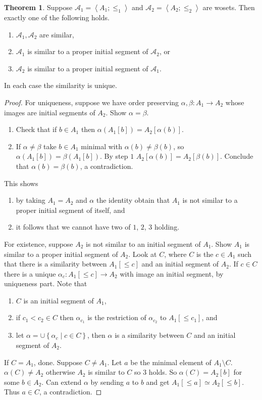 \documentclass{article}
\newcommand{\A}{\mathcal{A}}
\newcommand{\rb}[1]{\left( #1 \right)}
\renewcommand{\sb}[1]{\left[ #1 \right]}
\newcommand{\cb}[1]{\left\{ #1 \right\}}
\newcommand{\ab}[1]{\left\langle #1 \right\rangle}
\theoremstyle{definition}\newtheorem{definition}{Definition}[subsection]
\theoremstyle{definition}\newtheorem{remark}[definition]{Remark}
\theoremstyle{definition}\newtheorem*{example}{Example}
\theoremstyle{definition}\newtheorem*{note}{Note}
\newtheorem{theorem}[definition]{Theorem}
\begin{document}
\begin{theorem}
\label{thm:3.3.7}
Suppose $ \A_1 = \ab{A_1; \le_1} $ and $ \A_2 = \ab{A_2; \le_2} $ are wosets. Then exactly one of the following holds.
\begin{enumerate}
\item $ \A_1, \A_2 $ are similar,
\item $ \A_1 $ is similar to a proper initial segment of $ \A_2 $, or
\item $ \A_2 $ is similar to a proper initial segment of $ \A_1 $.
\end{enumerate}
In each case the similarity is unique.
\end{theorem}

\begin{proof}
For uniqueness, suppose we have order preserving $ \alpha, \beta : A_1 \to A_2 $ whose images are initial segments of $ A_2 $. Show $ \alpha = \beta $.
\begin{enumerate}
\item Check that if $ b \in A_1 $ then $ \alpha\rb{A_1\sb{b}} = A_2\sb{\alpha\rb{b}} $.
\item If $ \alpha \ne \beta $ take $ b \in A_1 $ minimal with $ \alpha\rb{b} \ne \beta\rb{b} $, so $ \alpha\rb{A_1\sb{b}} = \beta\rb{A_1\sb{b}} $. By step $ 1 $ $ A_2\sb{\alpha\rb{b}} = A_2\sb{\beta\rb{b}} $. Conclude that $ \alpha\rb{b} = \beta\rb{b} $, a contradiction.
\end{enumerate}
This shows
\begin{enumerate}
\item by taking $ A_1 = A_2 $ and $ \alpha $ the identity obtain that $ A_1 $ is not similar to a proper initial segment of itself, and
\item it follows that we cannot have two of $ 1 $, $ 2 $, $ 3 $ holding.
\end{enumerate}
For existence, suppose $ A_2 $ is not similar to an initial segment of $ A_1 $. Show $ A_1 $ is similar to a proper initial segment of $ A_2 $. Look at $ C $, where $ C $ is the $ c \in A_1 $ such that there is a similarity between $ A_1\sb{\le c} $ and an initial segment of $ A_2 $. If $ c \in C $ there is a unique $ \alpha_c : A_1\sb{\le c} \to A_2 $ with image an initial segment, by uniqueness part. Note that
\begin{enumerate}
\item $ C $ is an initial segment of $ A_1 $,
\item if $ c_1 < c_2 \in C $ then $ \alpha_{c_1} $ is the restriction of $ \alpha_{c_2} $ to $ A_1\sb{\le c_1} $, and
\item let $ \alpha = \cup \cb{\alpha_c \mid c \in C} $, then $ \alpha $ is a similarity between $ C $ and an initial segment of $ A_2 $.
\end{enumerate}
If $ C = A_1 $, done. Suppose $ C \ne A_1 $. Let $ a $ be the minimal element of $ A_1 \setminus C $. $ \alpha\rb{C} \ne A_2 $ otherwise $ A_2 $ is similar to $ C $ so $ 3 $ holds. So $ \alpha\rb{C} = A_2\sb{b} $ for some $ b \in A_2 $. Can extend $ \alpha $ by sending $ a $ to $ b $ and get $ A_1\sb{\le a} \simeq A_2\sb{\le b} $. Thus $ a \in C $, a contradiction.
\end{proof}
\end{document}
